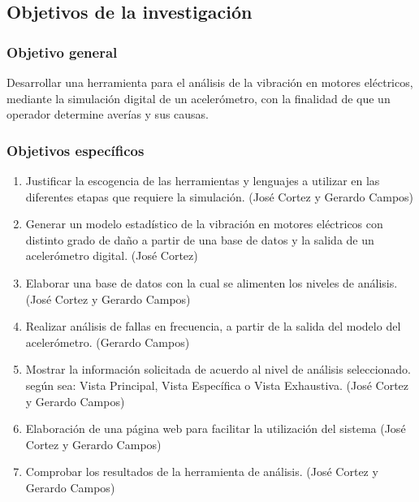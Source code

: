 \subsection{Objetivos de la investigación}

\subsubsection{Objetivo general}
	Desarrollar una herramienta para el análisis de la vibración en motores eléctricos, mediante la simulación digital de un acelerómetro, con la finalidad de que un operador determine averías y sus causas.


\subsubsection{Objetivos específicos}

	\begin{enumerate}
		\item Justificar la escogencia de las herramientas y lenguajes a utilizar en las diferentes etapas que requiere la simulación. (José Cortez y Gerardo Campos)

		\item Generar un modelo estadístico de la vibración en motores eléctricos con distinto grado de daño a partir de una base de datos y la salida de un acelerómetro digital. (José Cortez)

		\item Elaborar una base de datos con la cual se alimenten los niveles de análisis. (José Cortez y Gerardo Campos) 
		
		\item Realizar análisis de fallas en frecuencia, a partir de la salida del modelo del acelerómetro. (Gerardo Campos)

		\item Mostrar la información solicitada de acuerdo al nivel de análisis seleccionado. según sea: Vista Principal, Vista Específica o Vista Exhaustiva. (José Cortez y Gerardo Campos)

		\item Elaboración de una página web para facilitar la utilización del sistema (José Cortez y Gerardo Campos)

		\item Comprobar los resultados de la herramienta de análisis. (José Cortez y Gerardo Campos)
	\end{enumerate}
